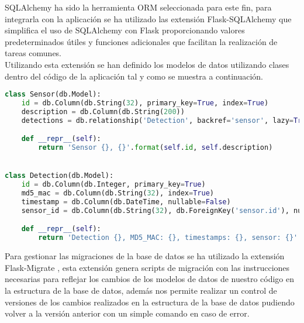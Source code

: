 \documentclass[../proyecto.tex]{subfiles}
\begin{document}
SQLAlchemy \cite{sqlalchemy} ha sido la herramienta ORM seleccionada para este fin, para integrarla con la aplicación se ha utilizado las extensión Flask-SQLAlchemy \cite{flask_sqlalchemy} que simplifica el uso de SQLAlchemy con Flask proporcionando valores predeterminados útiles y funciones adicionales que facilitan la realización de tareas comunes.\\

Utilizando esta extensión se han definido los modelos de datos utilizando clases dentro del código de la aplicación tal y como se muestra a continuación.\\

\begin{minipage}{\linewidth}
\begin{lstlisting}[language=Python, caption=Definición de modelos utilizando SQLAlchemy, captionpos=b, frame=single]
class Sensor(db.Model):
    id = db.Column(db.String(32), primary_key=True, index=True)
    description = db.Column(db.String(200))
    detections = db.relationship('Detection', backref='sensor', lazy=True)

    def __repr__(self):
        return 'Sensor {}, {}'.format(self.id, self.description)


class Detection(db.Model):
    id = db.Column(db.Integer, primary_key=True)
    md5_mac = db.Column(db.String(32), index=True)
    timestamp = db.Column(db.DateTime, nullable=False)
    sensor_id = db.Column(db.String(32), db.ForeignKey('sensor.id'), nullable=False)

    def __repr__(self):
        return 'Detection {}, MD5_MAC: {}, timestamps: {}, sensor: {}'.format(self.id, self.md5_mac, self.timestamp, self.sensor_id)
\end{lstlisting}
\end{minipage}

Para gestionar las migraciones de la base de datos se ha utilizado la extensión Flask-Migrate \cite{flask_migrate}, esta extensión genera scripts de migración con las instrucciones necesarias para reflejar los cambios de los modelos de datos de nuestro código en la estructura de la base de datos, además nos permite realizar un control de versiones de los cambios realizados en la estructura de la base de datos pudiendo volver a la versión anterior con un simple comando en caso de error.\\


\\
\end{document}
